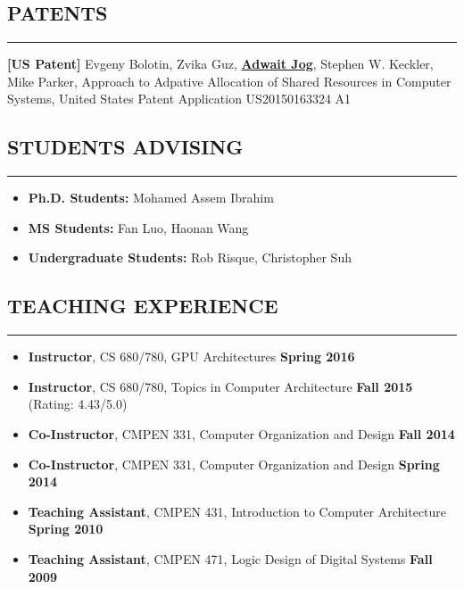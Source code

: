 \documentclass[10pt,a4]{article}
\begin{document}
\subsection*{PATENTS}
\hrule
\vspace{0.2cm}

\begin{description}
\item{\bf [US Patent]}
Evgeny Bolotin, Zvika Guz, {\bf \underline{Adwait Jog}}, Stephen W. Keckler, Mike Parker, 
Approach to Adpative Allocation of Shared Resources in Computer Systems, 
United States Patent Application US20150163324 A1 

\end{description}

\subsection*{STUDENTS ADVISING}
\hrule
\vspace{0.2cm}
\begin{itemize}
\item {\bf Ph.D. Students:} Mohamed Assem Ibrahim
\item {\bf MS Students:}  Fan Luo, Haonan Wang
\item {\bf Undergraduate Students:} Rob Risque, Christopher Suh 
\end{itemize}

\subsection*{TEACHING EXPERIENCE}
\hrule
\vspace{0.2cm}
\begin{itemize}
\item{\bf Instructor}, CS 680/780, GPU Architectures \hfill {\bf Spring 2016} 
\item{\bf Instructor}, CS 680/780, Topics in Computer Architecture \hfill {\bf Fall 2015} (Rating: 4.43/5.0)
\item{\bf Co-Instructor}, CMPEN 331, Computer Organization and Design \hfill {\bf Fall 2014} 
\item{\bf Co-Instructor}, CMPEN 331, Computer Organization and Design \hfill {\bf Spring 2014} 
\item{\bf Teaching Assistant}, CMPEN 431, Introduction to Computer Architecture  \hfill {\bf Spring 2010} 
\item{\bf Teaching Assistant}, CMPEN 471, Logic Design of Digital Systems  \hfill {\bf Fall 2009} 
\end{itemize}
\end{document}

